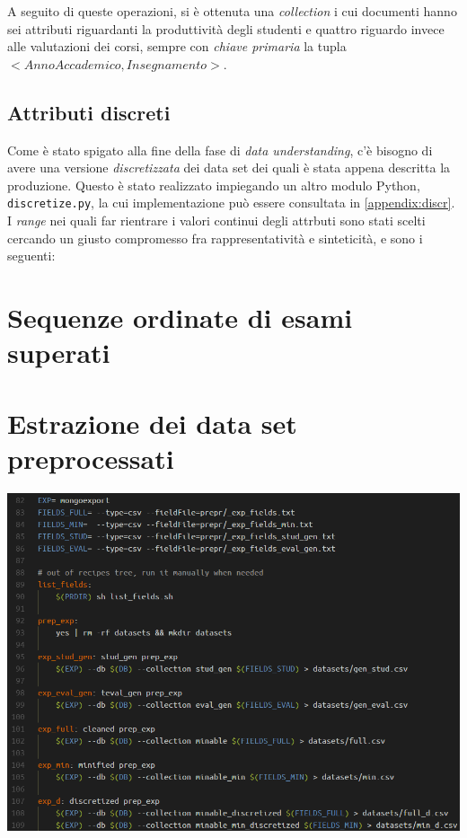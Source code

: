 		

		A seguito di queste operazioni, si è ottenuta una \textit{collection} i cui documenti hanno sei attributi riguardanti la produttività degli studenti e quattro riguardo invece alle valutazioni dei corsi, sempre con \textit{chiave primaria} la tupla $< Anno Accademico, Insegnamento >$.
	
	\subsection{Attributi discreti}

		Come è stato spigato alla fine della fase di \textit{data understanding}, c'è bisogno di avere una versione \textit{discretizzata} dei data set dei quali è stata appena descritta la produzione. Questo è stato realizzato impiegando un altro modulo Python, \texttt{discretize.py}, la cui implementazione può essere consultata in \ref{appendix:discr}. \\

		I \textit{range} nei quali far rientrare i valori continui degli attrbuti sono stati scelti cercando un giusto compromesso fra rappresentatività e sinteticità, e sono i seguenti:

		

\section{Sequenze ordinate di esami superati}

\section{Estrazione dei data set preprocessati}

	\begin{center}
		\includegraphics[scale=0.7]{img/export.png}
	\end{center}

